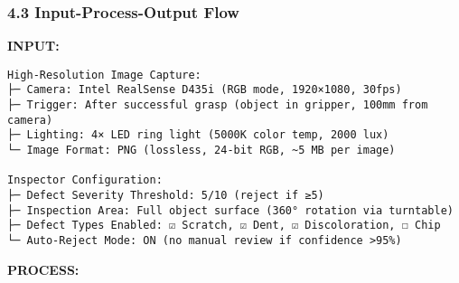 \documentclass[
]{article}
\begin{document}
\hypertarget{input-process-output-flow-1}{%
\subsubsection{4.3 Input-Process-Output
Flow}\label{input-process-output-flow-1}}

\textbf{INPUT:}

\begin{verbatim}
High-Resolution Image Capture:
├─ Camera: Intel RealSense D435i (RGB mode, 1920×1080, 30fps)
├─ Trigger: After successful grasp (object in gripper, 100mm from camera)
├─ Lighting: 4× LED ring light (5000K color temp, 2000 lux)
└─ Image Format: PNG (lossless, 24-bit RGB, ~5 MB per image)

Inspector Configuration:
├─ Defect Severity Threshold: 5/10 (reject if ≥5)
├─ Inspection Area: Full object surface (360° rotation via turntable)
├─ Defect Types Enabled: ☑ Scratch, ☑ Dent, ☑ Discoloration, ☐ Chip
└─ Auto-Reject Mode: ON (no manual review if confidence >95%)
\end{verbatim}

\textbf{PROCESS:}
\end{document}
